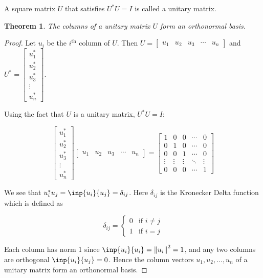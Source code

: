 \documentclass[twofold]{article}
\newcommand*\adj[1]{#1^*}
\newcommand*\norm[1]{\left \Vert #1 \right\Vert}
\theoremstyle{plain}
\newtheorem{theorem}{Theorem}
\theoremstyle{definition}
\theoremstyle{remark}
\begin{document}
A square matrix \(U\) that satisfies \(\adj{U} U = I\) is called a unitary matrix.

\begin{theorem} The columns of a unitary matrix \(U\) form an orthonormal basis. \end{theorem}
\begin{proof}  Let \(u_i\) be the \(i^\text{th}\) column of \(U\). Then \(U = \begin{bmatrix} u_1 & u_2 & u_3 & \cdots & u_n \end{bmatrix}\) and \(\adj{U} = \begin{bmatrix} \adj{u_1} \\ \adj{u_2} \\ \adj{u_3} \\ \vdots \\ \adj{u_n} \end{bmatrix} \). 

Using the fact that \(U\) is a unitary matrix, \(\adj{U} U = I\):

\[  \begin{bmatrix} \adj{u_1} \\ \adj{u_2} \\ \adj{u_3} \\ \vdots \\ \adj{u_n} \end{bmatrix} \begin{bmatrix} u_1 & u_2 & u_3 & \cdots & u_n \end{bmatrix} = \begin{bmatrix} 1 & 0 & 0 & \cdots & 0 \\
0 & 1 & 0 & \cdots & 0 \\
0 & 0 & 1 & \cdots & 0 \\
\vdots & \vdots & \vdots & \ddots & \vdots \\
0 & 0 & 0 & \cdots & 1\end{bmatrix}\]

We see that \(\adj{u_i} u_j = \inp{u_i}{u_j} = \delta_{ij}\). Here \(\delta_{ij}\) is the Kronecker Delta function which is defined as

\[\delta_{ij} = \begin{cases} 
0 & \text{if } i \ne j \\
1 & \text{if } i = j \end{cases}
 \]


Each column has norm 1 since \(\inp{u_i}{u_i}= \norm{u_i}^2  =1\), and any two columns are orthogonal \(\inp{u_i}{u_j} = 0\). Hence the column vectors \(u_1, u_2, \ldots , u_n\) of a unitary matrix form an orthonormal basis.
    \end{proof}
\end{document}
